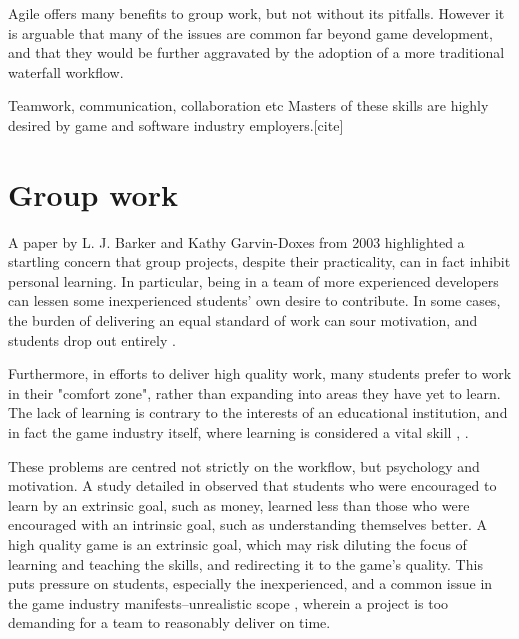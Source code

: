 \documentclass{scrartcl}
\begin{document}
Agile offers many benefits to group work, but not without its pitfalls. However it is arguable that many of the issues are common far beyond game development, and that they would be further aggravated by the adoption of a more traditional waterfall workflow.

Teamwork, communication, collaboration etc Masters of these skills are highly desired by game and software industry employers.[cite]


\section{Group work}
A paper by L. J. Barker and Kathy Garvin-Doxes from 2003 \cite{group2003} highlighted a startling concern that group projects, despite their practicality, can in fact inhibit personal learning. In particular, being in a team of more experienced developers can lessen some inexperienced students' own desire to contribute. In some cases, the burden of delivering an equal standard of work can sour motivation, and students drop out entirely \cite{group2003}.

Furthermore, in efforts to deliver high quality work, many students prefer to work in their "comfort zone", rather than expanding into areas they have yet to learn.\cite{group2003} \cite{group2005} The lack of learning is contrary to the interests of an educational institution, and in fact the game industry itself, where learning is considered a vital skill \cite{collaboration}, \cite{devstudy}.

These problems are centred not strictly on the workflow, but psychology and motivation. A study detailed in \cite{motivation} observed that students who were encouraged to learn by an extrinsic goal, such as money, learned less than those who were encouraged with an intrinsic goal, such as understanding themselves better. A high quality game is an extrinsic goal, which may risk diluting the focus of learning and teaching the skills, and redirecting it to the game's quality. This puts pressure on students, especially the inexperienced, and a common issue in the game industry manifests--unrealistic scope \cite{problems}, wherein a project is too demanding for a team to reasonably deliver on time.
\end{document}
